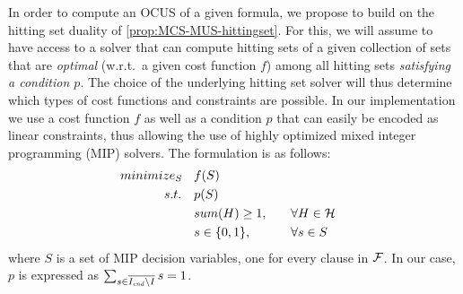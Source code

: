 In order to compute an OCUS of a given formula, we propose to build on the hitting set duality of \cref{prop:MCS-MUS-hittingset}. 
For this, we will assume to have access to a solver \cohs that can compute hitting sets of a given collection of sets that are \emph{optimal} (w.r.t.\ a given cost function $f$) among all hitting sets \emph{satisfying a condition $p$}. 
The choice of the underlying hitting set solver will thus determine which types of cost functions and constraints are possible. 
In our implementation we use a cost function $f$ as well as a condition $p$ that can easily be encoded as linear constraints, thus allowing the use of highly optimized mixed integer programming (MIP) solvers. The \cohs formulation is as follows:
\begin{align*}
\small
  minimize_S \quad & f(S) \\ 
  s.t. \quad & p(S) \\
       & sum(H) \geq 1, \quad &&\forall H \in \setstohit \\
       & s \in \{0,1\}, \quad &&\forall s \in S
\end{align*}
where $S$ is a set of MIP decision variables, one for every clause in $\mathcal{F} $. In our case, $p$ is expressed as $\sum_{s \in \overline{I_\mathit{end} \setminus I}} s = 1$. 
